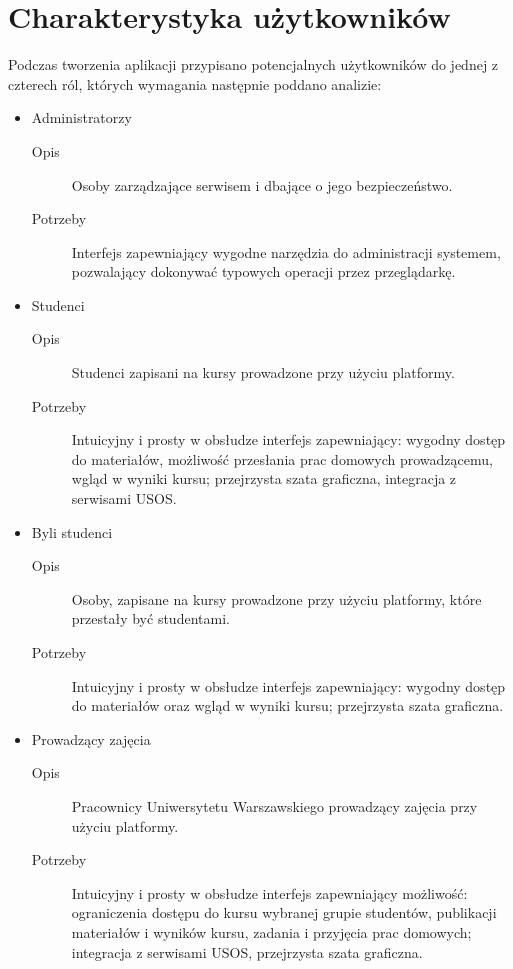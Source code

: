 \documentclass{pracamgr}
\begin{document}
%
%
\section{Charakterystyka użytkowników}

Podczas tworzenia aplikacji przypisano potencjalnych użytkowników
do jednej z czterech ról, których wymagania następnie poddano analizie:

\begin{itemize}
   \item Administratorzy
      \begin{description}
         \item[Opis] Osoby zarządzające serwisem i dbające o jego bezpieczeństwo.
         \item[Potrzeby] Interfejs zapewniający wygodne narzędzia do 
            administracji systemem, pozwalający dokonywać typowych operacji 
            przez przeglądarkę.
      \end{description}
   \item Studenci
      \begin{description}
         \item[Opis] Studenci zapisani na kursy prowadzone przy użyciu platformy.
         \item[Potrzeby] Intuicyjny i prosty w obsłudze interfejs zapewniający: 
            wygodny dostęp do materiałów, możliwość przesłania prac domowych 
            prowadzącemu, wgląd w wyniki kursu; przejrzysta szata graficzna, 
            integracja z serwisami USOS. 
      \end{description}  
   \item Byli studenci
      \begin{description}
         \item[Opis] Osoby, zapisane na kursy prowadzone przy użyciu platformy, 
            które przestały być studentami.
         \item[Potrzeby] Intuicyjny i prosty w obsłudze interfejs zapewniający: 
            wygodny dostęp do materiałów oraz wgląd w wyniki kursu; przejrzysta 
            szata graficzna.
      \end{description}  
   \item Prowadzący zajęcia
      \begin{description}
         \item[Opis] Pracownicy Uniwersytetu Warszawskiego prowadzący zajęcia 
            przy użyciu platformy.
         \item[Potrzeby] Intuicyjny i prosty w obsłudze interfejs zapewniający 
            możliwość: ograniczenia dostępu do kursu wybranej grupie
            studentów, publikacji materiałów i wyników kursu, zadania i 
            przyjęcia prac domowych; integracja z serwisami USOS, przejrzysta 
            szata graficzna.
      \end{description}  
\end{itemize}
\end{document}
